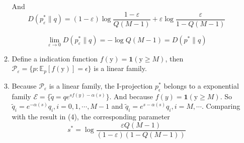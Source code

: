 \documentclass[a4paper]{article}
\begin{document}
\begin{enumerate}
\begin{enumerate}
  And \begin{equation}
    D(p^*_{\varepsilon}\| q) = (1-\varepsilon) \log \frac{1-\varepsilon}{ Q(M-1)} + \varepsilon \log \frac{\varepsilon}{ 1-Q(M-1)}
  \end{equation}

  \begin{equation}
    \lim_{\varepsilon \to 0 }  D(p^*_{\varepsilon}\| q) =  - \log  Q(M-1) = D(p^* \| q)
  \end{equation}

  \item Define a indication function $f(\mathrm{y}) = \mathbf{1}(\mathrm{y} \geqslant M)$, then $\mathcal{P}_{\varepsilon} = \{p: \mathbb{E}_{p}[f(\mathrm{y})] = \epsilon\}$ is a linear family.
  
  \item Because $\mathcal{P}_{\varepsilon}$ is a linear family, the I-projection $p_{\epsilon}^*$ belongs to a exponential family $\mathcal{E} = \{\tilde{q} = qe^{sf(y) - \alpha(s)}\}$. And because $f(y) = \mathbf{1}(\mathrm{y} \geqslant M)$. So $\tilde{q}_i  =  e^{-\alpha(s)} q_i, i =0,1,\cdots,M-1$ and $\tilde{q}_i  =  e^{s-\alpha(s)} q_i, i =M,\cdots$. Comparing with the result in (4), the corresponding parameter \begin{equation}
    s^* = \log \frac{\varepsilon Q(M-1)}{(1-\varepsilon)(1-Q(M-1))}
  \end{equation}
  
\end{enumerate}

\end{enumerate}
  

  
\end{document}
